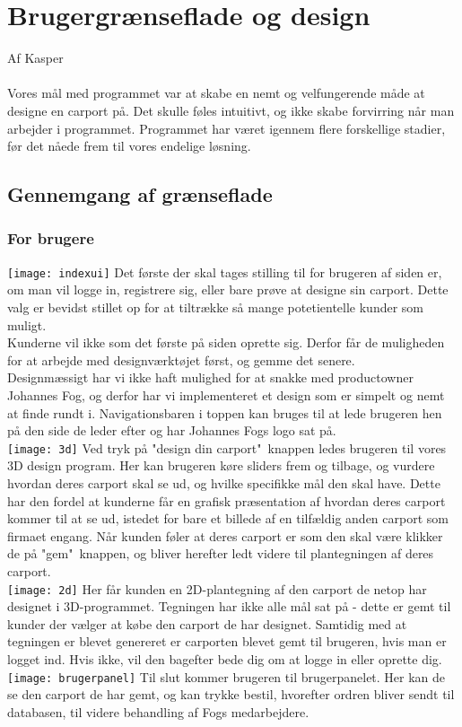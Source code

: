 \section{Brugergrænseflade og design}
Af Kasper\\\\
Vores mål med programmet var at skabe en nemt og velfungerende måde at designe en carport på. Det skulle føles intuitivt, og ikke skabe forvirring når man arbejder i programmet. Programmet har været igennem flere forskellige stadier, før det nåede frem til vores endelige løsning.
\\
\subsection{Gennemgang af grænseflade}
\subsubsection{For brugere}
\texttt{[image: indexui]}
Det første der skal tages stilling til for brugeren af siden er, om man vil logge in, registrere sig, eller bare prøve at designe sin carport. Dette valg er bevidst stillet op for at tiltrække så mange potetientelle kunder som muligt.\\
Kunderne vil ikke som det første på siden oprette sig. Derfor får de muligheden for at arbejde med designværktøjet først, og gemme det senere.\\
Designmæssigt har vi ikke haft mulighed for at snakke med productowner Johannes Fog, og derfor har vi implementeret et design som er simpelt og nemt at finde rundt i.
Navigationsbaren i toppen kan bruges til at lede brugeren hen på den side de leder efter og har Johannes Fogs logo sat på.\\
\texttt{[image: 3d]}
Ved tryk på "design din carport"\ knappen ledes brugeren til vores 3D design program. Her kan brugeren køre sliders frem og tilbage, og vurdere hvordan deres carport skal se ud, og hvilke specifikke mål den skal have. Dette har den fordel at kunderne får en grafisk præsentation af hvordan deres carport kommer til at se ud, istedet for bare et billede af en tilfældig anden carport som firmaet engang. Når kunden føler at deres carport er som den skal være klikker de på "gem"\ knappen, og bliver herefter ledt videre til plantegningen af deres carport.\\
\texttt{[image: 2d]}
Her får kunden en 2D-plantegning af den carport de netop har designet i 3D-programmet. Tegningen har ikke alle mål sat på - dette er gemt til kunder der vælger at købe den carport de har designet. Samtidig med at tegningen er blevet genereret er carporten blevet gemt til brugeren, hvis man er logget ind. Hvis ikke, vil den bagefter bede dig om at logge in eller oprette dig.\\
\texttt{[image: brugerpanel]}
Til slut kommer brugeren til brugerpanelet. Her kan de se den carport de har gemt, og kan trykke bestil, hvorefter ordren bliver sendt til databasen, til videre behandling af Fogs medarbejdere. \\

